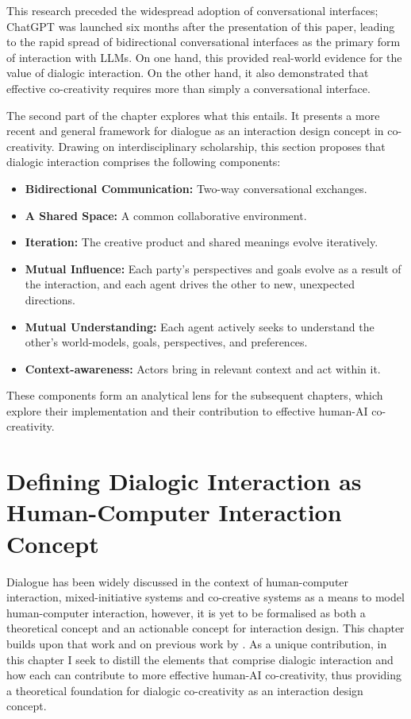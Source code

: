 This research preceded the widespread adoption of conversational interfaces; ChatGPT was launched six months after the presentation of this paper, leading to the rapid spread of bidirectional conversational interfaces as the primary form of interaction with LLMs. On one hand, this provided real-world evidence for the value of dialogic interaction. On the other hand, it also demonstrated that effective co-creativity requires more than simply a conversational interface.

The second part of the chapter explores what this entails. It presents a more recent and general framework for dialogue as an interaction design concept in co-creativity. Drawing on interdisciplinary scholarship, this section proposes that dialogic interaction comprises the following components:

\begin{itemize}
\item \textbf{Bidirectional Communication:} Two-way conversational exchanges.
\item \textbf{A Shared Space:} A common collaborative environment.
\item \textbf{Iteration:} The creative product and shared meanings evolve iteratively.
\item \textbf{Mutual Influence:} Each party’s perspectives and goals evolve as a result of the interaction, and each agent drives the other to new, unexpected directions.
\item \textbf{Mutual Understanding:} Each agent actively seeks to understand the other's world-models, goals, perspectives, and preferences.
\item \textbf{Context-awareness:} Actors bring in relevant context and act within it.
\end{itemize}

These components form an analytical lens for the subsequent chapters, which explore their implementation and their contribution to effective human-AI co-creativity.





\section{Defining Dialogic Interaction as Human-Computer Interaction Concept}

Dialogue has been widely discussed in the context of human-computer interaction, mixed-initiative systems and co-creative systems \cite{Allen1999-sr, Yannakakis2014-zs, Deterding2017-wh} as a means to model human-computer interaction, however, it is yet to be formalised as both a theoretical concept and an actionable concept for interaction design. This chapter builds upon that work and on previous work by \cite{Bown2020-oc, Bown2024-yx}. As a unique contribution, in this chapter I seek to distill the elements that comprise dialogic interaction and how each can contribute to more effective human-AI co-creativity, thus providing a theoretical foundation for dialogic co-creativity as an interaction design concept. 

